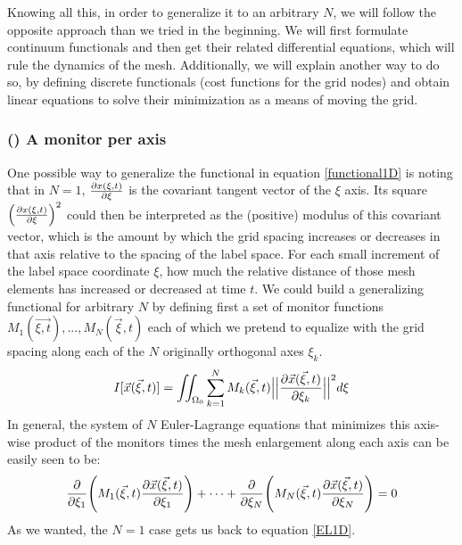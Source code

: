 \documentclass[11pt, a4paper]{article} %
\begin{document}
Knowing all this, in order to generalize it to an arbitrary $N$, we will follow the opposite approach than we tried in the beginning. We will first formulate continuum functionals and then get their related differential equations, which will rule the dynamics of the mesh. Additionally, we will explain another way to do so, by defining discrete functionals (cost functions for the grid nodes) and obtain linear equations to solve their minimization as a means of moving the grid.\vspace{-0.3cm}

\subsubsection*{\bf (\textalpha) A monitor per axis\vspace{-0.2cm}}
One possible way to generalize the functional in equation \eqref{functional1D} is noting that in $N=1$, $\pdv{x(\xi,t)}{\xi}$ is the covariant tangent vector of the $\xi$ axis. Its square $\qty(\pdv{x(\xi,t)}{\xi})^2$ could then be interpreted as the (positive) modulus of this covariant vector, which is the amount by which the grid spacing increases or decreases in that axis relative to the spacing of the label space. For each small increment of the label space coordinate $\xi$, how much the relative distance of those mesh elements has increased or decreased at time $t$. We could build a generalizing functional for arbitrary $N$ by defining first a set of monitor functions $M_1(\vec{\xi,t}),...,M_N(\vec{\xi},t)$ each of which we pretend to equalize with the grid spacing along each of the $N$ originally orthogonal axes $\xi_k$.
\begin{equation}
I[\vec{x}(\vec{\xi},t)]=\iint_{\Omega_0} \sum_{k=1}^N M_k(\vec{\xi},t) \Big|\Big|\pdv{\vec{x}(\vec{\xi},t)}{\xi_k}\Big|\Big|^2 d\xi
\end{equation}
In general, the system of $N$ Euler-Lagrange equations that minimizes this axis-wise product of the monitors times the mesh enlargement along each axis can be easily seen to be:
\begin{equation}
\pdv{}{\xi_1} \qty( M_1(\vec{\xi},t)\pdv{\vec{x}(\vec{\xi},t)}{\xi_1} )+\cdots+\pdv{}{\xi_N}\qty( M_N(\vec{\xi},t)\pdv{\vec{x}(\vec{\xi},t)}{\xi_N} )=0
\end{equation}
As we wanted, the $N=1$ case gets us back to equation \eqref{EL1D}.
\end{document}
